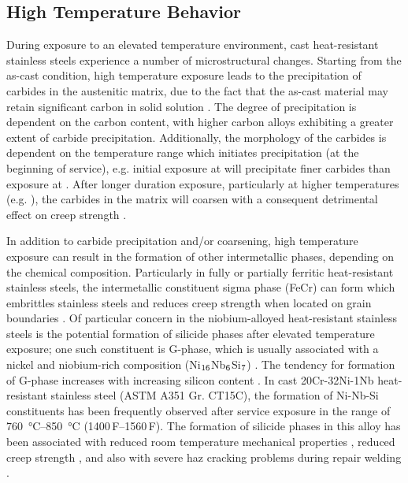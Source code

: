 \subsection{High Temperature Behavior}
During exposure to an elevated temperature environment, cast heat-resistant stainless steels experience a number of microstructural changes. Starting from the as-cast condition, high temperature exposure leads to the precipitation of carbides in the austenitic matrix, due to the fact that the as-cast material may retain significant carbon in solid solution \cite{avery_cast_1969}. The degree of precipitation is dependent on the carbon content, with higher carbon alloys exhibiting a greater extent of carbide precipitation. Additionally, the morphology of the carbides is dependent on the temperature range which initiates precipitation (at the beginning of service), e.g. initial exposure at  will precipitate finer carbides than exposure at  \cite{avery_cast_1969}. After longer duration exposure, particularly at higher temperatures (e.g. ), the carbides in the matrix will coarsen with a consequent detrimental effect on creep strength \cite{avery_cast_1969}.


In addition to carbide precipitation and/or coarsening, high temperature exposure can result in the formation of other intermetallic phases, depending on the chemical composition.  Particularly in fully or partially ferritic heat-resistant stainless steels, the intermetallic constituent sigma phase (FeCr) can form which embrittles stainless steels and reduces creep strength when located on grain boundaries \cite{sourmail_precipitation_2001,avery_cast_1969}. Of particular concern in the niobium-alloyed heat-resistant stainless steels is the potential formation of silicide phases after elevated temperature exposure; one such constituent is G-phase, which is usually associated with a nickel and niobium-rich composition (Ni$_\textnormal{16}$Nb$_\textnormal{6}$Si$_\textnormal{7}$) \cite{sourmail_precipitation_2001}. The tendency for formation of G-phase increases with increasing silicon content \cite{ecob_formation_1987,pedro_ibanez_effects_1993}. In cast 20Cr-32Ni-1Nb heat-resistant stainless steel (ASTM A351 Gr. CT15C), the formation of Ni-Nb-Si constituents has been frequently observed after service exposure in the range of \SIrange[range-phrase=--]{760}{850}{\degreeCelsius} (1400\,\textdegree{}F--1560\,\textdegree{}F). The formation of silicide phases in this alloy has been associated with reduced room temperature mechanical properties \cite{hoffman_high_2000-1,shibasaki_experience_1994}, reduced creep strength \cite{shibasaki_experience_1994}, and also with severe \gls{haz} cracking problems during repair welding \cite{hoffman_weld_1998,knowles_service_2004}.

